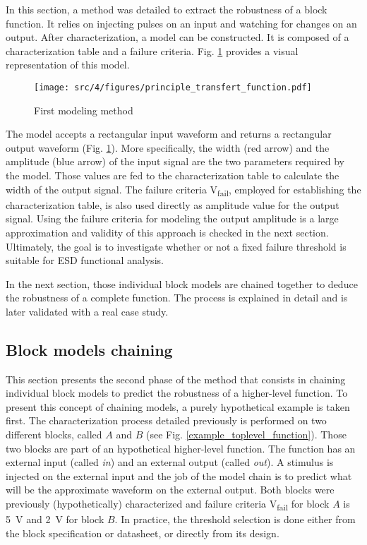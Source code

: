 In this section, a method was detailed to extract the robustness of a block function.
It relies on injecting pulses on an input and watching for changes on an output.
After characterization, a model can be constructed.
It is composed of a characterization table and a failure criteria.
Fig. \ref{fig:principle-transfert-func} provides a visual representation of this model.

\begin{figure}[!h]
  \centering
  \texttt{[image: src/4/figures/principle\_transfert\_function.pdf]}
  \caption{First modeling method}
  \label{fig:principle-transfert-func}
\end{figure}

The model accepts a rectangular input waveform and returns a rectangular output waveform (Fig. \ref{fig:principle-transfert-func}).
More specifically, the width (red arrow) and the amplitude (blue arrow) of the input signal are the two parameters required by the model.
Those values are fed to the characterization table to calculate the width of the output signal.
The failure criteria V\textsubscript{fail}, employed for establishing the characterization table, is also used directly as amplitude value for the output signal.
Using the failure criteria for modeling the output amplitude is a large approximation and validity of this approach is checked in the next section.
Ultimately, the goal is to investigate whether or not a fixed failure threshold is suitable for ESD functional analysis.

In the next section, those individual block models are chained together to deduce the robustness of a complete function.
The process is explained in detail and is later validated with a real case study.

\subsection{Block models chaining}
\label{sec:block-chaining}

This section presents the second phase of the method that consists in chaining individual block models to predict the robustness of a higher-level function.
To present this concept of chaining models, a purely hypothetical example is taken first.
The characterization process detailed previously is performed on two different blocks, called $A$ and $B$ (see Fig. \ref{example_toplevel_function}).
Those two blocks are part of an hypothetical higher-level function.
The function has an external input (called \textit{in}) and an external output (called \textit{out}).
A stimulus is injected on the external input and the job of the model chain is to predict what will be the approximate waveform on the external output.
Both blocks were previously (hypothetically) characterized and failure criteria V\textsubscript{fail} for block $A$ is \SI{5}{\volt} and \SI{2}{\volt} for block $B$.
In practice, the threshold selection is done either from the block specification or datasheet, or directly from its design.


